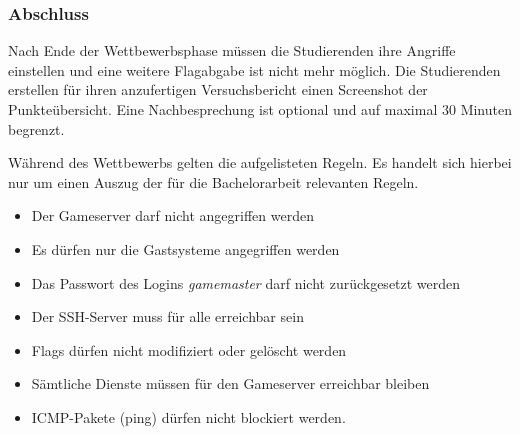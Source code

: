 \subsubsection{Abschluss}
Nach Ende der Wettbewerbsphase müssen die Studierenden ihre Angriffe einstellen und eine weitere Flagabgabe ist nicht mehr möglich. Die Studierenden erstellen für ihren anzufertigen Versuchsbericht einen Screenshot der Punkteübersicht. Eine Nachbesprechung ist optional und auf maximal 30 Minuten begrenzt.

Während des Wettbewerbs gelten die aufgelisteten Regeln. Es handelt sich hierbei nur um einen Auszug der für die Bachelorarbeit relevanten Regeln.
\begin{itemize}
\item Der Gameserver darf nicht angegriffen werden
\item Es dürfen nur die Gastsysteme angegriffen werden
\item Das Passwort des Logins \textit{gamemaster} darf nicht zurückgesetzt werden
\item Der SSH-Server muss für alle erreichbar sein
\item Flags dürfen nicht modifiziert oder gelöscht werden
\item Sämtliche Dienste müssen für den Gameserver erreichbar bleiben
\item ICMP-Pakete (ping) dürfen nicht blockiert werden.
\end{itemize} \cite[S.9]{quadePraktikumITSecurity2017} \cite[S.10-11]{sosnaKonzeptionUndRealisierung2010}